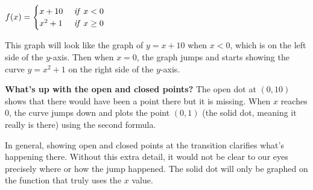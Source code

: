 \documentclass{ximera}
\begin{document}
\begin{example}
$f(x)=\begin{cases} x+10 & \mbox{ \emph{if} }x<0\\x^2+1 & \mbox{ \emph{if} } x\geq 0\end{cases}$

This graph will look like the graph of $y=x+10$ when $x<0$, which is on the left side of the $y$-axis. Then when $x=0$, the graph jumps and starts showing the curve $y=x^2+1$ on the right side of the $y$-axis.


\textbf{What's up with the open and closed points?} The open dot at $(0,10)$ shows that there would have been a point there but it is missing. When $x$ reaches $0$, the curve jumps down and plots the point $(0,1)$ (the solid dot, meaning it really is there) using the second formula.

In general, showing open and closed points at the transition clarifies what's happening there. Without this extra detail, it would not be clear to our eyes precisely where or how the jump happened. The solid dot will only be graphed on the function that truly uses the $x$ value.
\end{example}
\end{document}
